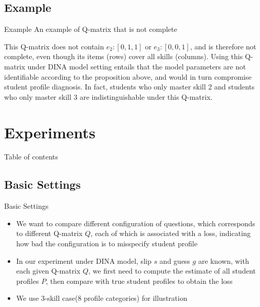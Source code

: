 \documentclass[handout]{beamer}
\begin{document}
\subsection[Example]{Example}
\begin{frame}{Example}
An example of Q-matrix that is not complete
\centerline{
}
This Q-matrix does not contain $e_2:[0,1,1]$ or $e_3:[0,0,1]$, and is therefore not complete, even though its items (rows) cover all skills (columns). Using this Q-matrix under DINA model setting entails that the model parameters are not identifiable according to the proposition above, and would in turn compromise student profile diagnosis. In fact, students who only master skill 2 and students who only master skill 3 are indistinguishable under this Q-matrix.
\end{frame}

\section{Experiments}
\begin{frame}{Table of contents}
\begin{multicols}{2}
\end{multicols}
\end{frame}

\subsection{Basic Settings}
\begin{frame}{Basic Settings}
	\begin{itemize}
		\item{We want to compare different configuration of questions, which corresponds to different Q-matrix $Q$, each of which is associated with a loss, indicating how bad the configuration is to misspecify student profile}
		\item{In our experiment under DINA model, slip $s$ and guess $g$ are known, with each given Q-matrix $Q$, we first need to compute the estimate of all student profiles $P$, then compare with true student profiles to obtain the loss}
		\item{We use 3-skill case(8 profile categories) for illustration} 		 
	\end{itemize}
\end{frame}
\end{document}
